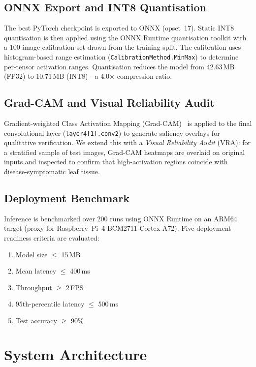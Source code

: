 \documentclass[conference]{IEEEtran}
\begin{document}
\subsection{ONNX Export and INT8 Quantisation}
\label{sec:quant}

The best PyTorch checkpoint is exported to ONNX (opset~17). Static INT8
quantisation is then applied using the ONNX Runtime quantisation toolkit
with a 100-image calibration set drawn from the training split. The
calibration uses histogram-based range estimation
(\texttt{CalibrationMethod.MinMax}) to determine per-tensor activation
ranges. Quantisation reduces the model from 42.63\,MB (FP32) to
10.71\,MB (INT8)---a 4.0$\times$ compression ratio.

\subsection{Grad-CAM and Visual Reliability Audit}
\label{sec:gradcam}

Gradient-weighted Class Activation Mapping (Grad-CAM)~\cite{b10} is
applied to the final convolutional layer (\texttt{layer4[1].conv2}) to
generate saliency overlays for qualitative verification. We extend this
with a \emph{Visual Reliability Audit} (VRA): for a stratified sample of
test images, Grad-CAM heatmaps are overlaid on original inputs and
inspected to confirm that high-activation regions coincide with
disease-symptomatic leaf tissue.

\subsection{Deployment Benchmark}
\label{sec:bench}

Inference is benchmarked over 200 runs using ONNX Runtime on an ARM64
target (proxy for Raspberry~Pi~4 BCM2711 Cortex-A72). Five
deployment-readiness criteria are evaluated:
\begin{enumerate}
    \item Model size $\leq$ 15\,MB
    \item Mean latency $\leq$ 400\,ms
    \item Throughput $\geq$ 2\,FPS
    \item 95th-percentile latency $\leq$ 500\,ms
    \item Test accuracy $\geq$ 90\%
\end{enumerate}

\section{System Architecture}
\label{sec:sysarch}
\end{document}
